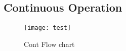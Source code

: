 \subsection{Continuous Operation}
\label{sec_cont_op}


\begin{figure}[ht]
	\centering
	\texttt{[image: test]}
	\caption{Cont Flow chart}
	\label{img_flow_cont}
\end{figure}